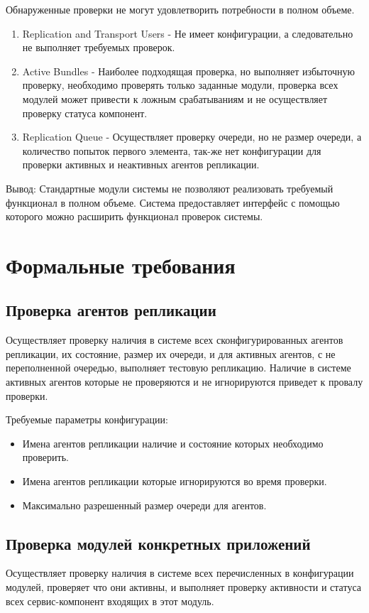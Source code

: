 	Обнаруженные проверки не могут удовлетворить потребности в полном объеме.
\begin{enumerate}
\item Replication and Transport Users - Не имеет конфигурации, а следовательно не выполняет требуемых проверок.
\item Active Bundles - Наиболее подходящая проверка, но выполняет избыточную проверку, необходимо проверять только заданные модули, проверка всех модулей может привести к ложным срабатываниям и не осуществляет проверку статуса компонент.
\item Replication Queue - Осуществляет проверку очереди, но не размер очереди, а количество попыток первого элемента, так-же нет конфигурации для проверки активных и неактивных агентов репликации.
\end{enumerate}

Вывод: Стандартные модули системы не позволяют реализовать требуемый функционал в полном объеме. Система предоставляет интерфейс с помощью которого можно расширить функционал проверок системы.

\section{Формальные требования}


\subsection{Проверка агентов репликации}
Осуществляет проверку наличия в системе всех сконфигурированных агентов репликации, их состояние, размер их очереди, и для активных агентов, с не переполненной очередью, выполняет тестовую репликацию. Наличие в системе активных агентов которые не проверяются и не игнорируются приведет к провалу проверки.

Требуемые параметры конфигурации:
\begin{itemize}
\item Имена агентов репликации наличие и состояние которых необходимо проверить.
\item Имена агентов репликации которые игнорируются во время проверки.
\item Максимально разрешенный размер очереди для агентов.
\end{itemize}

\subsection{Проверка модулей конкретных приложений}
Осуществляет проверку наличия в системе всех перечисленных в конфигурации модулей, проверяет что они активны, и выполняет проверку активности и статуса всех сервис-компонент входящих в этот модуль.

